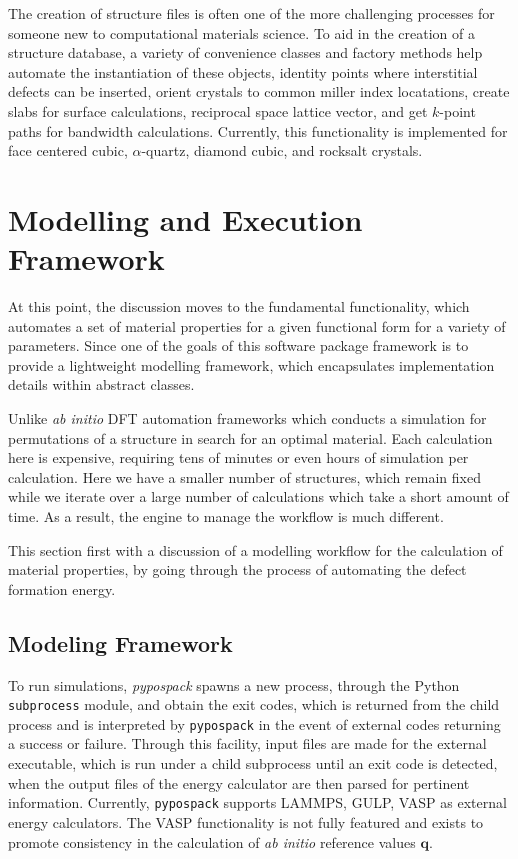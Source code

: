 The creation of structure files is often one of the more challenging processes for someone new to computational materials science.  To aid in the creation of a structure database, a variety of convenience classes and factory methods help automate the instantiation of these objects, identity points where interstitial defects can be inserted, orient crystals to common miller index locatations, create slabs for surface calculations, reciprocal space lattice vector, and get $k$-point paths for bandwidth calculations.  Currently, this functionality is implemented for face centered cubic, $\alpha$-quartz, diamond cubic, and rocksalt crystals.

\section{Modelling and Execution Framework}
\label{sec:potential_evalaution}

At this point, the discussion moves to the fundamental functionality, which automates a set of material properties for a given functional form for a variety of parameters.  Since one of the goals of this software package framework is to provide a lightweight modelling framework, which encapsulates implementation details within abstract classes.

Unlike \emph{ab initio} DFT automation frameworks which conducts a simulation for permutations of a structure in search for an optimal material.  Each calculation here is expensive, requiring tens of minutes or even hours of simulation per calculation.  Here we have a smaller number of structures, which remain fixed while we iterate over a large number of calculations which take a short amount of time.  As a result, the engine to manage the workflow is much different.

This section first with a discussion of a modelling workflow for the calculation of material properties, by going through the process of automating the defect formation energy.

\subsection{Modeling Framework}

To run simulations, \emph{pypospack} spawns a new process, through the Python \verb|subprocess| module, and obtain the exit codes, which is returned from the child process and is interpreted by \verb|pypospack| in the event of external codes returning a success or failure.  Through this facility, input files are made for the external executable, which is run under a child subprocess until an exit code is detected, when the output files of the energy calculator are then parsed for pertinent information.  Currently, \verb|pypospack| supports LAMMPS, GULP, VASP as external energy calculators.  The VASP functionality is not fully featured and exists to promote consistency in the calculation of \emph{ab initio} reference values $\bm{q}$.

